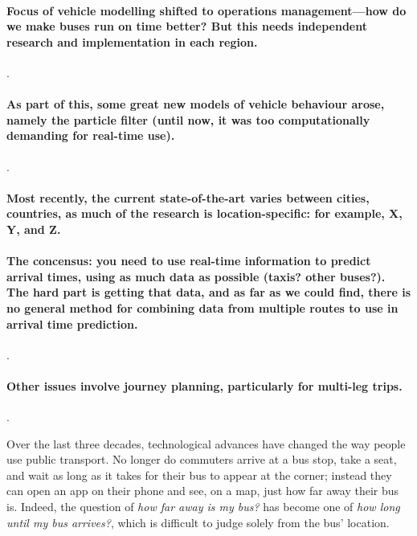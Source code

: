 \paragraph{Focus of vehicle modelling shifted to operations management---how do we make buses run on time better? But this needs independent research and implementation in each region.}
\cite{Wessel_2016, Hans_2015}.


\paragraph{As part of this, some great new models of vehicle behaviour arose, namely the particle filter (until now, it was too computationally demanding for real-time use).}
\cite{Hans_2015b,Chen_2014}.


\paragraph{Most recently, the current state-of-the-art varies between cities, countries, as much of the research is location-specific: for example, X, Y, and Z.}


\paragraph{The concensus: you need to use real-time information to predict arrival times, using as much data as possible (taxis? other buses?). The hard part is getting that data, and as far as we could find, there is no general method for combining data from multiple routes to use in arrival time prediction.}
\cite{Ma_2019,Salonen_2013,Xinghao_2013}.


\paragraph{Other issues involve journey planning, particularly for multi-leg trips.}
\cite{Horn_2004,Hame_2013a,Hame_2013b,Zheng_2016,Berczi_2017}.



\pagebreak
Over the last three decades, technological advances have changed the way people use public transport.
No longer do commuters arrive at a bus stop, take a seat,
and wait as long as it takes for their bus to appear at the corner;
instead they can open an app on their phone and see, on a map,
just how far away their bus is.
Indeed, the question of \emph{how far away is my bus?}
has become one of \emph{how long until my bus arrives?},
which is difficult to judge solely from the bus' location.


